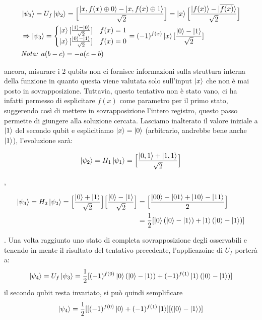\documentclass[12pt,a4paper,openright]{report}
\newcommand*\xor{\mathbin{\oplus}}
\begin{document}
\begin{center}
    \begin{align*}
        &\ket{\psi_3} = U_f\ket{\psi_2} = \Big[  \frac{\ket{x,f(x) \xor 0} - \ket{x,f(x) \xor 1}}{\sqrt2} \Big] = \ket{x} \Big[\frac{\ket{f(x)} - \ket{\overline{f(x)}} } {\sqrt2} \Big]    \\
        & \Rightarrow   \ket{\psi_3} =  
        \begin{cases} 
              \ket{x}[\frac{\ket{1} - \ket{0}}{\sqrt{2}}] 
                      & f(x) = 1\\
              \ket{x}[\frac{\ket{0} - \ket{1}}{\sqrt{2}}] 
                         & f(x) = 0
          \end{cases} = 
          (-1)^{f(x)}\ket{x}[\frac{\ket{0} - \ket{1}}{\sqrt{2}}] \\
        & \textit{Nota: $a(b-c) = -a(c-b)$}  
    \end{align*}
\end{center}
ancora, misurare i 2 qubits non ci fornisce informazioni sulla struttura interna della funzione in quanto questa viene valutata solo sull'input $\ket{x}$ che non è mai posto in sovrapposizione.
Tuttavia, questo tentativo non è stato vano, ci ha infatti permesso di esplicitare $f(x)$ come parametro per il primo stato, suggerendo così di mettere in sovrapposizione l'intero registro, questo passo 
permette di giungere alla soluzione cercata. Lasciamo inalterato il valore iniziale a $\ket1$ del secondo qubit e esplicitiamo $\ket{x}=\ket{0}$ (arbitrario, andrebbe bene anche $\ket1$), l'evoluzione sarà:

\begin{center}
    \begin{align*}
        \ket{\psi_2} = H_1\ket{\psi_1} = \Big[  \frac{\ket{0,1} + \ket{1,1}}{\sqrt2} \Big]  
    \end{align*}
\end{center}
,

\begin{center}
    \begin{align*}
        \ket{\psi_3} = H_2\ket{\psi_2} = \Big[  \frac{\ket{0} + \ket{1}}{\sqrt2} \Big]\Big[  \frac{\ket{0} - \ket{1}}{\sqrt2} \Big] &= \Big[  \frac{\ket{00} - \ket{01} + \ket{10} - \ket{11}}{2} \Big] \\
                                                                                                                                    &= \frac{1}{2}[\ket{0} (\ket{0} - \ket{1}) + \ket{1}(\ket{0} - \ket{1})] 
    \end{align*}
\end{center}
. Una volta raggiunto uno stato di completa sovrapposizione degli osservabili e tenendo in mente il risultato del tentativo precedente, l'applicazoine di $U_f$ porterà a:
\[
    \ket{\psi_4} = U_f\ket{\psi_3} = \frac{1}{2}[(-1)^{f(0)}\ket{0} (\ket{0} - \ket{1}) + (-1)^{f(1)}\ket{1}(\ket{0} - \ket{1})] 
\]
il secondo qubit resta invariato, si può quindi semplificare
\[
    \ket{\psi_4} = \frac{1}{2}[ [ (-1)^{f(0)}\ket{0} + (-1)^{f(1)}\ket{1} ] [ (\ket{0} - \ket{1}) ]
\]
\end{document}

